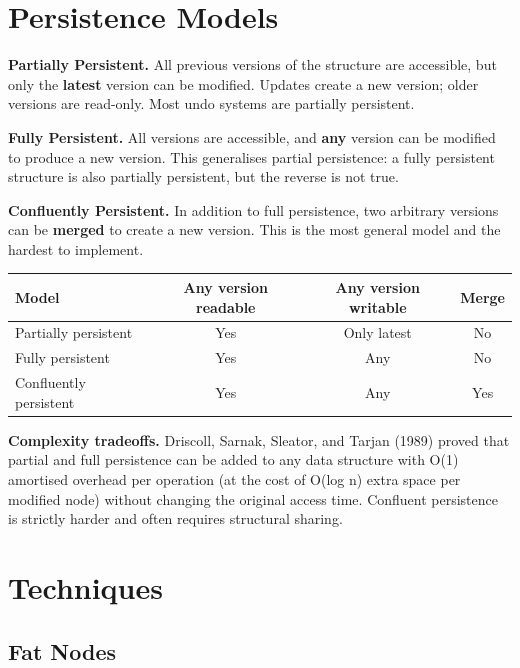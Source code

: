\section{Persistence Models}\label{sec21:persistence-models}

\textbf{Partially Persistent.} All previous versions of the structure are accessible, but only the \textbf{latest} version can be modified. Updates create a new version; older versions are read-only. Most undo systems are partially persistent.

\textbf{Fully Persistent.} All versions are accessible, and \textbf{any} version can be modified to produce a new version. This generalises partial persistence: a fully persistent structure is also partially persistent, but the reverse is not true.

\textbf{Confluently Persistent.} In addition to full persistence, two arbitrary versions can be \textbf{merged} to create a new version. This is the most general model and the hardest to implement.

\begin{center}
\begin{tabular}{lccc}
\toprule
Model & Any version readable & Any version writable & Merge \\
\midrule
Partially persistent & Yes & Only latest & No \\
Fully persistent & Yes & Any & No \\
Confluently persistent & Yes & Any & Yes \\
\bottomrule
\end{tabular}
\end{center}

\textbf{Complexity tradeoffs.} Driscoll, Sarnak, Sleator, and Tarjan (1989) proved that partial and full persistence can be added to any data structure with O(1) amortised overhead per operation (at the cost of O(log n) extra space per modified node) without changing the original access time. Confluent persistence is strictly harder and often requires structural sharing.

\section{Techniques}\label{sec21:techniques}

\subsection{Fat Nodes}\label{sec21:fat-nodes}

